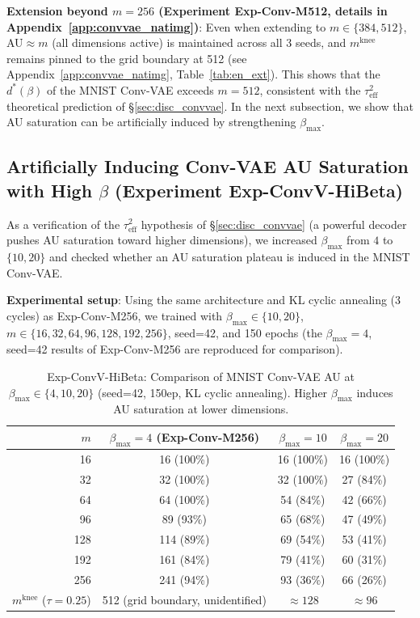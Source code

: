 \documentclass[make,article,submit,pdftex,moreauthors]{Definitions/mdpi}
\newcommand{\mknee}{m^{\mathrm{knee}}}
\begin{document}
\textbf{Extension beyond $m=256$ (Experiment Exp-Conv-M512, details in Appendix~\ref{app:convvae_natimg})}:
Even when extending to $m \in \{384, 512\}$, AU$\approx m$ (all dimensions active) is maintained across
all 3 seeds, and $\mknee$ remains pinned to the grid boundary at 512
(see Appendix~\ref{app:convvae_natimg}, Table~\ref{tab:en_ext}).
This shows that the $d^*(\beta)$ of the MNIST Conv-VAE exceeds $m=512$,
consistent with the $\tau^2_\mathrm{eff}$ theoretical prediction of \S\ref{sec:disc_convvae}.
In the next subsection, we show that AU saturation can be artificially induced by strengthening $\beta_{\max}$.

\subsection{Artificially Inducing Conv-VAE AU Saturation with High $\beta$ (Experiment Exp-ConvV-HiBeta)}\label{sec:exp_hibeta}

As a verification of the $\tau^2_\mathrm{eff}$ hypothesis of \S\ref{sec:disc_convvae}
(a powerful decoder pushes AU saturation toward higher dimensions),
we increased $\beta_{\max}$ from $4$ to $\{10, 20\}$ and checked whether an AU saturation plateau
is induced in the MNIST Conv-VAE.

\textbf{Experimental setup}: Using the same architecture and KL cyclic annealing (3 cycles) as Exp-Conv-M256,
we trained with $\beta_{\max} \in \{10, 20\}$, $m \in \{16, 32, 64, 96, 128, 192, 256\}$,
seed=42, and 150 epochs (the $\beta_{\max}=4$, seed=42 results of Exp-Conv-M256 are reproduced for comparison).

\begin{table}[H]
\centering
\caption{Exp-ConvV-HiBeta: Comparison of MNIST Conv-VAE AU at $\beta_\mathrm{max} \in \{4, 10, 20\}$ (seed=42, 150ep, KL cyclic annealing). Higher $\beta_\mathrm{max}$ induces AU saturation at lower dimensions.}
\label{tab:hibeta}
\small
\begin{tabular}{r ccc}
\toprule
$m$ & $\beta_{\max}=4$ (Exp-Conv-M256) & $\beta_{\max}=10$ & $\beta_{\max}=20$ \\
\midrule
 16  & 16  (100\%)& 16 (100\%) & 16 (100\%) \\
 32  & 32  (100\%)& 32 (100\%) & 27 (84\%)  \\
 64  & 64  (100\%)& 54 (84\%)  & 42 (66\%)  \\
 96  & 89  (93\%) & 65 (68\%)  & 47 (49\%)  \\
128  & 114 (89\%) & 69 (54\%)  & 53 (41\%)  \\
192  & 161 (84\%) & 79 (41\%)  & 60 (31\%)  \\
256  & 241 (94\%) & 93 (36\%)  & 66 (26\%)  \\
\midrule
$\mknee$ ($\tau=0.25$) & 512 (grid boundary, unidentified) & $\approx 128$ & $\approx 96$ \\
\bottomrule
\end{tabular}
\end{table}
\end{document}
